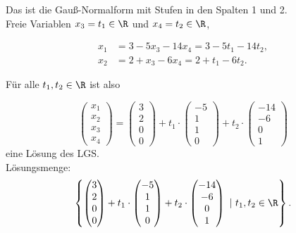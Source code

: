 Das ist die Gau{\ss}-Normalform mit Stufen in den Spalten 1 und 2.\\

Freie Variablen $x_3 = t_1 \in \R$ und $x_4 = t_2 \in \R$,

\begin{align*}
	x_1 &= 3 - 5x_3 - 14x_4 = 3 - 5t_1 - 14t_2,\\
	x_2 &= 2 +x_3 - 6x_4 = 2 + t_1 -6t_2.
\end{align*}

F\"ur alle $t_1, t_2 \in \R$ ist also

$$
	\begin{pmatrix}
		x_1\\
		x_2\\
		x_3\\
		x_4
	\end{pmatrix}
	=
	\begin{pmatrix}
		3\\
		2\\
		0\\
		0
	\end{pmatrix}
	+
	t_1 \cdot
	\begin{pmatrix}
		-5\\
		1\\
		1\\
		0
	\end{pmatrix}	
	+t_2\cdot
	\begin{pmatrix}
		-14\\
		-6\\
		0\\
		1
	\end{pmatrix}	
$$
eine L\"osung des LGS. \\

L\"osungsmenge:
$$
	\left\{
		\begin{pmatrix}
			3\\
			2\\
			0\\
			0
		\end{pmatrix}
		+
		t_1 \cdot
		\begin{pmatrix}
			-5\\
			1\\
			1\\
			0
		\end{pmatrix}	
		+t_2\cdot
		\begin{pmatrix}
			-14\\
			-6\\
			0\\
			1
		\end{pmatrix}		
		~|~
		t_1, t_2 \in \R	
	\right\}.
$$

